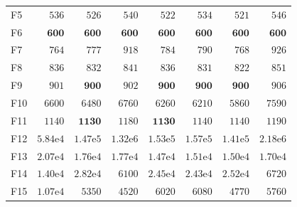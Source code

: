 \begin{tabular}{lrrrrrrr}
F5 & $536$ & $526$ & $540$ & $522$ & $534$ & $521$ & $546$ \\
F6 & $\mathbf{600}$ & $\mathbf{600}$ & $\mathbf{600}$ & $\mathbf{600}$ & $\mathbf{600}$ & $\mathbf{600}$ & $\mathbf{600}$ \\
F7 & $764$ & $777$ & $918$ & $784$ & $790$ & $768$ & $926$ \\
F8 & $836$ & $832$ & $841$ & $836$ & $831$ & $822$ & $851$ \\
F9 & $901$ & $\mathbf{900}$ & $902$ & $\mathbf{900}$ & $\mathbf{900}$ & $\mathbf{900}$ & $906$ \\
F10 & $6600$ & $6480$ & $6760$ & $6260$ & $6210$ & $5860$ & $7590$ \\
F11 & $1140$ & $\mathbf{1130}$ & $1180$ & $\mathbf{1130}$ & $1140$ & $1140$ & $1190$ \\
F12 & $5.84\mathrm{e}{4}$ & $1.47\mathrm{e}{5}$ & $1.32\mathrm{e}{6}$ & $1.53\mathrm{e}{5}$ & $1.57\mathrm{e}{5}$ & $1.41\mathrm{e}{5}$ & $2.18\mathrm{e}{6}$ \\
F13 & $2.07\mathrm{e}{4}$ & $1.76\mathrm{e}{4}$ & $1.77\mathrm{e}{4}$ & $1.47\mathrm{e}{4}$ & $1.51\mathrm{e}{4}$ & $1.50\mathrm{e}{4}$ & $1.70\mathrm{e}{4}$ \\
F14 & $1.40\mathrm{e}{4}$ & $2.82\mathrm{e}{4}$ & $6100$ & $2.45\mathrm{e}{4}$ & $2.43\mathrm{e}{4}$ & $2.52\mathrm{e}{4}$ & $6720$ \\
F15 & $1.07\mathrm{e}{4}$ & $5350$ & $4520$ & $6020$ & $6080$ & $4770$ & $5760$ \\
\bottomrule
\end{tabular}
